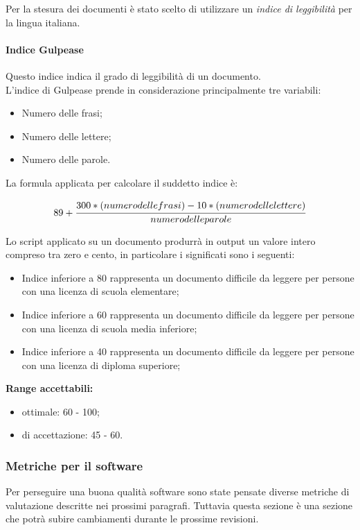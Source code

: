 \documentclass{scalatekids-article}
\begin{document}
\label{sec:metricheDocumenti}
Per la stesura dei documenti è stato scelto di utilizzare un \textit{indice di leggibilità} per la lingua italiana.
\paragraph{Indice Gulpease}
\label{par:metricheGulpease}
Questo indice indica il grado di leggibilità di un documento.\\L'indice di Gulpease prende in considerazione principalmente tre variabili:
\begin{itemize}
\item Numero delle frasi;
\item Numero delle lettere;
\item Numero delle parole.
\end{itemize}
La formula applicata per calcolare il suddetto indice è:
\begin{center}
  \begin{equation}
    89 + \cfrac{300 * (numero delle frasi) - 10 * (numero delle lettere)}{numero delle parole}
  \end{equation}
\end{center}
Lo script applicato su un documento produrrà in output un valore intero compreso tra zero e cento, in particolare i significati sono i seguenti:
\begin{itemize}
\item Indice inferiore a 80 rappresenta un documento difficile da leggere per persone con una licenza di scuola elementare;
\item Indice inferiore a 60 rappresenta un documento difficile da leggere per persone con una licenza di scuola media inferiore;
\item Indice inferiore a 40 rappresenta un documento difficile da leggere per persone con una licenza di diploma superiore;
\end{itemize}
\textbf{Range accettabili:}
\begin{itemize}
\item {} ottimale: 60 - 100;
\item {} di accettazione: 45 - 60.
\end{itemize}

\subsubsection{Metriche per il software}
\label{sec:metricheSW}

Per perseguire una buona qualità software sono state pensate diverse metriche di valutazione descritte nei prossimi paragrafi. Tuttavia questa sezione è una sezione che potrà subire cambiamenti durante le prossime revisioni.
\end{document}
